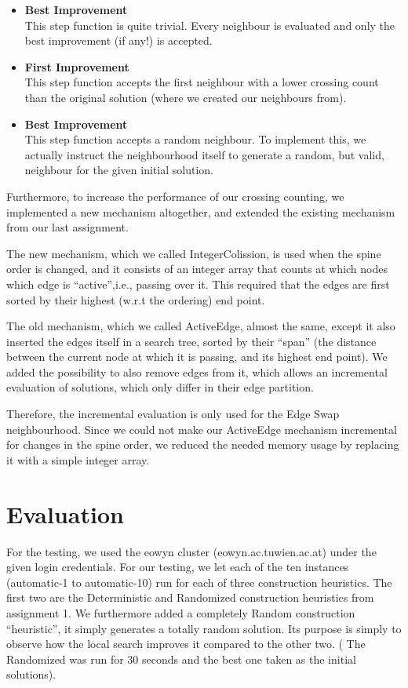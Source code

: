\documentclass [11pt]{article}
\begin{document}
\begin{itemize}
  \item \textbf{ Best Improvement} \\
  This step function is quite trivial. Every neighbour is evaluated and only the best improvement (if any!) is accepted. 
  \item \textbf{ First Improvement} \\
  This step function accepts the first neighbour with a lower crossing count than the original solution (where we created our neighbours from).
   \item \textbf{ Best Improvement} \\
  This step function accepts a random neighbour. To implement this, we actually instruct the neighbourhood itself to generate a random, but valid, neighbour for the given initial solution. 
\end{itemize}

Furthermore, to increase the performance of our crossing counting, we implemented a new mechanism altogether, and extended the existing mechanism from our last assignment. 

The new mechanism, which we called IntegerColission, is used when the spine order is changed, and it consists of an integer array that counts at which nodes which edge is ``active'',i.e., passing over it. This required that the edges are first sorted by their highest (w.r.t the ordering) end point. 

The old mechanism, which we called ActiveEdge, almost the same, except it also inserted the edges itself in a search tree, sorted by their ``span'' (the distance between the current node at which it is passing, and its highest end point). We added the possibility to also remove edges from it, which allows an incremental evaluation of solutions, which only differ in their edge partition. 

Therefore, the incremental evaluation is only used for the Edge Swap neighbourhood. Since we could not make our ActiveEdge mechanism incremental for changes in the spine order, we reduced the needed memory usage by replacing it with a simple integer array.


\section{Evaluation}
For the testing, we used the eowyn cluster (eowyn.ac.tuwien.ac.at) under the given login credentials. For our testing, we let each of the ten instances (automatic-1 to automatic-10) run for each of three construction heuristics. The first two are the Deterministic and Randomized construction heuristics from assignment 1. We furthermore added a completely Random construction ``heuristic'', it simply generates a totally random solution. Its purpose is simply to observe how the local search improves it compared to the other two. ( The Randomized was run for 30 seconds and the best one taken as the initial solutions). 
\end{document}
